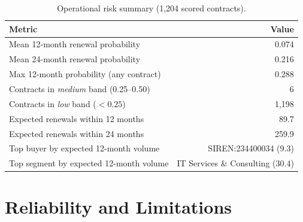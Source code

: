 \documentclass[11pt,a4paper]{article}
\begin{document}
\begin{table}[H]
\centering
\caption{Operational risk summary (1{,}204 scored contracts).}
\label{tab:risk}
\small
\begin{tabular}{@{}lr@{}}
\toprule
\textbf{Metric} & \textbf{Value} \\
\midrule
Mean 12-month renewal probability & 0.074 \\
Mean 24-month renewal probability & 0.216 \\
Max 12-month probability (any contract) & 0.288 \\
Contracts in \emph{medium} band (0.25--0.50) & 6 \\
Contracts in \emph{low} band ($<0.25$) & 1{,}198 \\
Expected renewals within 12 months & 89.7 \\
Expected renewals within 24 months & 259.9 \\
Top buyer by expected 12-month volume & SIREN:234400034 (9.3) \\
Top segment by expected 12-month volume & IT Services \& Consulting (30.4) \\
\bottomrule
\end{tabular}
\end{table}

\section{Reliability and Limitations}
\label{sec:reliability}
\end{document}
